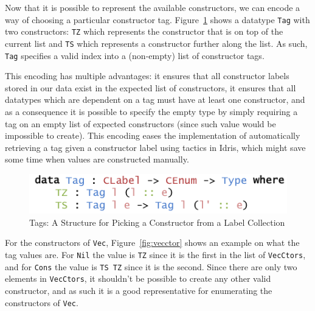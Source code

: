\documentclass{ituthesis}
\newcommand{\ttconstructor}[1]{\textcolor{constructor-color}{\texttt{#1}}}
\newcommand{\tttype}[1]{\textcolor{type-color}{\texttt{#1}}}
\newcommand{\ttdec}[1]{\textcolor{declared-var-color}{\texttt{#1}}}
\theoremstyle{definition}
\begin{document}
Now that it is possible to represent the available constructors, we can encode a way of choosing a particular constructor tag. Figure~\ref{fig:ctortags} shows a datatype \tttype{Tag} with two constructors:
\ttconstructor{TZ} which represents the constructor that is on top of the current list and \ttconstructor{TS} which represents a constructor further along the list. As such, \tttype{Tag} specifies a valid index into a (non-empty) list of constructor tags.

This encoding has multiple advantages: it ensures that all constructor labels stored in our data exist in the expected list of constructors, it ensures that all datatypes which are dependent on a tag must have at least one constructor, and as a consequence
it is possible to specify the empty type by simply requiring a tag on an empty list of expected constructors (since such value would be impossible to create).
This encoding eases the implementation of automatically retrieving a tag given a constructor label using tactics in Idris, which might save some time when values
are constructed manually.

\begin{figure}[ht]
\begin{center}
    \includegraphics[scale=0.5]{Figures/AnInformativeEncodingofConstructorsTags.png}
\end{center}
\caption{Tags: A Structure for Picking a Constructor from a Label Collection}
\label{fig:ctortags}
\end{figure}

For the constructors of \tttype{Vec}, Figure~\ref{fig:vecctor} shows an example on what the tag values are. For \ttconstructor{Nil} the value is \ttconstructor{TZ} since it is the first in the list of \ttdec{VecCtors}, and for \ttconstructor{Cons} the value
is \ttconstructor{TS~TZ} since it is the second. Since there are only two elements in \ttdec{VecCtors}, it shouldn't be possible to create any other valid constructor, and as such it is a good representative for enumerating the constructors of \tttype{Vec}.
\end{document}
